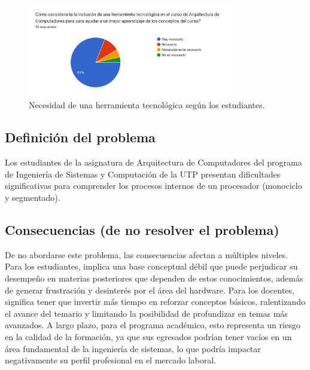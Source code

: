 \documentclass[12pt, letterpaper]{article} %
\begin{document}
\begin{figure}[h!]
    \centering
    \includegraphics[width=0.8\textwidth]{figura2.png}
    \caption{Necesidad de una herramienta tecnológica según los estudiantes.}
    \label{fig:grafico2}
\end{figure}

\subsection{Definición del problema}
Los estudiantes de la asignatura de Arquitectura de Computadores del programa de Ingeniería de Sistemas y Computación de la UTP presentan dificultades significativas para comprender los procesos internos de un procesador (monociclo y segmentado).

\subsection{Consecuencias (de no resolver el problema)}
De no abordarse este problema, las consecuencias afectan a múltiples niveles. Para los estudiantes, implica una base conceptual débil que puede perjudicar su desempeño en materias posteriores que dependen de estos conocimientos, además de generar frustración y desinterés por el área del hardware. Para los docentes, significa tener que invertir más tiempo en reforzar conceptos básicos, ralentizando el avance del temario y limitando la posibilidad de profundizar en temas más avanzados. A largo plazo, para el programa académico, esto representa un riesgo en la calidad de la formación, ya que sus egresados podrían tener vacíos en un área fundamental de la ingeniería de sistemas, lo que podría impactar negativamente su perfil profesional en el mercado laboral.
\end{document}
